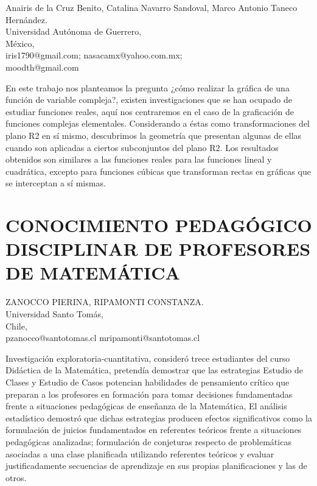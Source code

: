\begin{datos}
Anairis de la Cruz Benito, Catalina Navarro Sandoval, Marco Antonio Taneco Hernández.\\
Universidad Autónoma de Guerrero,\\
\hfill México, \\
\hfill iris1790@gmail.com; nasacamx@yahoo.com.mx;\\\hfill moodth@gmail.com
\end{datos}

En este trabajo nos planteamos la pregunta ¿cómo realizar la gráfica
de una función de variable compleja?, existen investigaciones que
se han ocupado de estudiar funciones reales, aquí nos centraremos
en el caso de la graficación de funciones complejas elementales. Considerando
a éstas como transformaciones del plano R2 en sí mismo, descubrimos
la geometría que presentan algunas de ellas cuando son aplicadas a
ciertos subconjuntos del plano R2. Los resultados obtenidos son similares
a las funciones reales para las funciones lineal y cuadrática, excepto
para funciones cúbicas que transforman rectas en gráficas que se interceptan
a sí mismas.


\section{CONOCIMIENTO PEDAGÓGICO DISCIPLINAR DE PROFESORES DE MATEMÁTICA}

\begin{datos}
ZANOCCO PIERINA, RIPAMONTI CONSTANZA.\\
Universidad Santo Tomás,\\
\hfill Chile, \\
\hfill pzanocco@santotomas.cl mripamonti@santotomas.cl
\end{datos}

Investigación exploratoria-cuantitativa, consideró trece estudiantes
del curso Didáctica de la Matemática, pretendía demostrar que las
estrategias Estudio de Clases y Estudio de Casos potencian habilidades
de pensamiento crítico que preparan a los profesores en formación
para tomar decisiones fundamentadas frente a situaciones pedagógicas
de enseñanza de la Matemática, El análisis estadístico demostró que
dichas estrategias producen efectos significativos como la formulación
de juicios fundamentados en referentes teóricos frente a situaciones
pedagógicas analizadas; formulación de conjeturas respecto de problemáticas
asociadas a una clase planificada utilizando referentes teóricos y
evaluar justificadamente secuencias de aprendizaje en sus propias
planificaciones y las de otros. 



